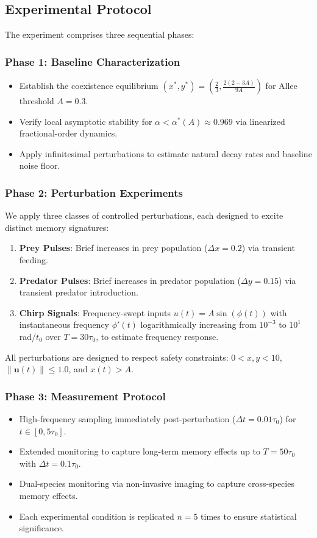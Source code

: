\subsection{Experimental Protocol}
The experiment comprises three sequential phases:

\subsubsection{Phase 1: Baseline Characterization}
\begin{itemize}
    \item Establish the coexistence equilibrium $(x^*, y^*) = \left(\frac{2}{3}, \frac{2(2-3A)}{9A}\right)$ for Allee threshold $A=0.3$.
    \item Verify local asymptotic stability for $\alpha < \alpha^*(A) \approx 0.969$ via linearized fractional-order dynamics.
    \item Apply infinitesimal perturbations to estimate natural decay rates and baseline noise floor.
\end{itemize}

\subsubsection{Phase 2: Perturbation Experiments}
We apply three classes of controlled perturbations, each designed to excite distinct memory signatures:
\begin{enumerate}
    \item \textbf{Prey Pulses}: Brief increases in prey population ($\Delta x = 0.2$) via transient feeding.
    \item \textbf{Predator Pulses}: Brief increases in predator population ($\Delta y = 0.15$) via transient predator introduction.
    \item \textbf{Chirp Signals}: Frequency-swept inputs $u(t) = A \sin(\phi(t))$ with instantaneous frequency $\phi'(t)$ logarithmically increasing from $10^{-3}$ to $10^{1}$ rad/$t_0$ over $T=30\tau_0$, to estimate frequency response.
\end{enumerate}
All perturbations are designed to respect safety constraints: $0 < x,y < 10$, $\|\mathbf{u}(t)\| \leq 1.0$, and $x(t) > A$.

\subsubsection{Phase 3: Measurement Protocol}
\begin{itemize}
    \item High-frequency sampling immediately post-perturbation ($\Delta t = 0.01\tau_0$) for $t \in [0, 5\tau_0]$.
    \item Extended monitoring to capture long-term memory effects up to $T = 50\tau_0$ with $\Delta t = 0.1\tau_0$.
    \item Dual-species monitoring via non-invasive imaging to capture cross-species memory effects.
    \item Each experimental condition is replicated $n=5$ times to ensure statistical significance.
\end{itemize}

